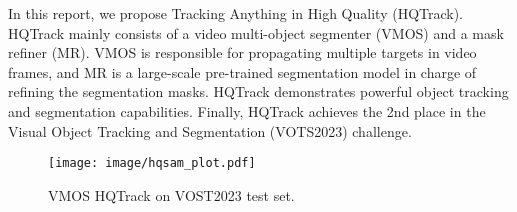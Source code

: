 \documentclass[10pt,twocolumn,letterpaper]{article}
\begin{document}
In this report, we propose Tracking Anything in High Quality (HQTrack).
HQTrack mainly consists of a video multi-object segmenter (VMOS) and a mask refiner (MR).
VMOS is responsible for propagating multiple targets in video frames, and MR is a large-scale pre-trained segmentation model in charge of refining the segmentation masks.
HQTrack demonstrates powerful object tracking and segmentation capabilities.
Finally, HQTrack achieves the 2nd place in the Visual Object Tracking and Segmentation (VOTS2023) challenge.


\begin{figure}[!t]
	\vspace{-2mm}
	\centering
	\texttt{[image: image/hqsam\_plot.pdf]}
	\vspace{-1.5mm}
	\caption{VMOS  HQTrack on VOST2023 test set. }
	\label{fig:hqsam_plot}
	\vspace{-2mm}
\end{figure}
 


{\small


}
\end{document}

